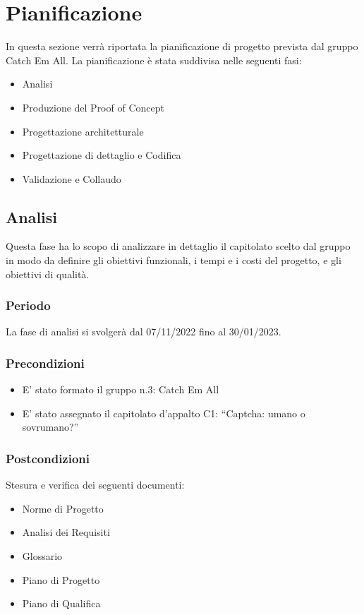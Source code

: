 \section{Pianificazione}
In questa sezione verrà riportata la pianificazione di progetto prevista dal gruppo Catch Em
All. La pianificazione è stata suddivisa nelle seguenti fasi:
\begin{itemize}
	\item Analisi
	\item Produzione del Proof of Concept
	\item Progettazione architetturale
    \item Progettazione di dettaglio e Codifica
	\item Validazione e Collaudo
\end{itemize}

\subsection{Analisi}
Questa fase ha lo scopo di analizzare in dettaglio il capitolato scelto dal gruppo in modo da definire gli obiettivi funzionali, i tempi e i costi del progetto, e gli obiettivi di qualità.

\subsubsection{Periodo}
La fase di analisi si svolgerà dal 07/11/2022 fino al 30/01/2023.

\subsubsection{Precondizioni}
\begin{itemize}
	\item E’ stato formato il gruppo n.3: Catch Em All
	\item E’ stato assegnato il capitolato d’appalto C1: “Captcha: umano o sovrumano?”
\end{itemize}

\subsubsection{Postcondizioni}
Stesura e verifica dei seguenti documenti:
\begin{itemize}
	\item Norme di Progetto
	\item Analisi dei Requisiti
	\item Glossario
    \item Piano di Progetto
	\item Piano di Qualifica
\end{itemize}

